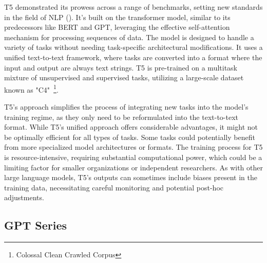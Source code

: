 T5 demonstrated its prowess across a range of benchmarks, setting new standards in the field of NLP (\textcite{raffel2023exploring}).
It's built on the transformer model, similar to its predecessors like BERT and GPT, leveraging the effective self-attention mechanism for processing sequences of data.
The model is designed to handle a variety of tasks without needing task-specific architectural modifications.
It uses a unified text-to-text framework, where tasks are converted into a format where the input and output are always text strings.
T5 is pre-trained on a multitask mixture of unsupervised and supervised tasks, utilizing a large-scale dataset known as "C4"~\footnote{Colossal Clean Crawled Corpus}.

T5's approach simplifies the process of integrating new tasks into the model's training regime, as they only need to be reformulated into the text-to-text format.
While T5's unified approach offers considerable advantages, it might not be optimally efficient for all types of tasks.
Some tasks could potentially benefit from more specialized model architectures or formats.
The training process for T5 is resource-intensive, requiring substantial computational power, which could be a limiting factor for smaller organizations or independent researchers.
As with other large language models, T5's outputs can sometimes include biases present in the training data, necessitating careful monitoring and potential post-hoc adjustments.

\subsection{GPT Series}
\label{subsec:gpt-series}

